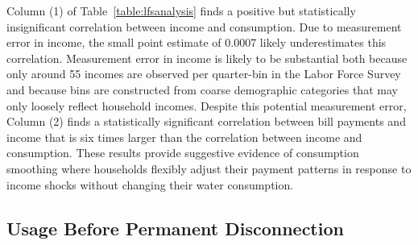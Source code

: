 \documentclass[12pt]{article}
\begin{document}
Column (1) of Table~\ref{table:lfsanalysis} finds a positive but statistically insignificant correlation between income and consumption.  Due to measurement error in income, the small point estimate of 0.0007 likely underestimates this correlation.  Measurement error in income is likely to be substantial both because only around 55 incomes are observed per quarter-bin in the Labor Force Survey and because bins are constructed from coarse demographic categories that may only loosely reflect household incomes.  Despite this potential measurement error, Column (2) finds a statistically significant correlation between bill payments and income that is six times larger than the correlation between income and consumption.  These results provide suggestive evidence of consumption smoothing where households flexibly adjust their payment patterns in response to income shocks without changing their water consumption.  



\subsection{Usage Before Permanent Disconnection}\label{appendix:permanentdc}


\end{document}
